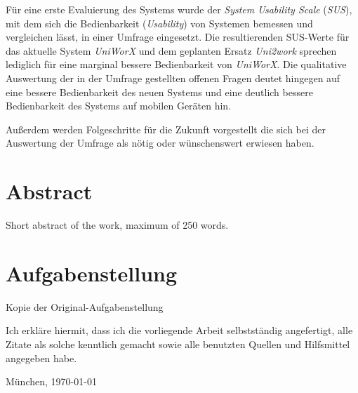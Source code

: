 \documentclass[11pt,a4paper,twoside,ngerman]{article}
\begin{document}
Für eine erste Evaluierung des Systems wurde der \textit{System Usability Scale} (\textit{SUS}), mit dem sich die Bedienbarkeit (\textit{Usability}) von Systemen bemessen und vergleichen lässt, in einer Umfrage eingesetzt. Die resultierenden SUS-Werte für das aktuelle System \textit{UniWorX} und dem geplanten Ersatz \textit{Uni2work} sprechen lediglich für eine marginal bessere Bedienbarkeit von \textit{UniWorX}. Die qualitative Auswertung der in der Umfrage gestellten offenen Fragen deutet hingegen auf eine bessere Bedienbarkeit des neuen Systems und eine deutlich bessere Bedienbarkeit des Systems auf mobilen Geräten hin.

Außerdem werden Folgeschritte für die Zukunft vorgestellt die sich bei der Auswertung der Umfrage als nötig oder wünschenswert erwiesen haben.

\section*{Abstract}

Short abstract of the work, maximum of 250 words.

\clearpage
\section*{Aufgabenstellung}

Kopie der Original-Aufgabenstellung

\vfill %

\noindent Ich erkläre hiermit, dass ich die vorliegende Arbeit
selbstständig angefertigt, alle Zitate als solche kenntlich gemacht
sowie alle benutzten Quellen und Hilfsmittel angegeben habe.

\bigskip\noindent München, \today

\vspace{4ex}\noindent\makebox[7cm]{\dotfill}


\cleardoublepage
\pagestyle{fancy}
\setcounter{page}{1}

\tableofcontents

\end{document}
